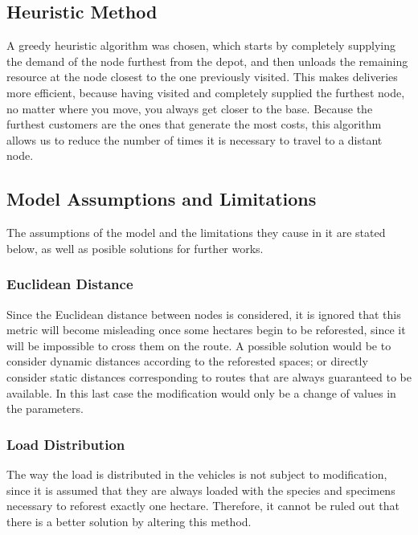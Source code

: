 \documentclass{amsart}
\begin{document}
        \subsection{Heuristic Method}\label{MetodoHeuristico}
        A greedy heuristic algorithm was chosen, which starts by completely supplying the demand of the node furthest from the depot, and then unloads the remaining resource at the node closest to the one previously visited. This makes deliveries more efficient, because having visited and completely supplied the furthest node, no matter where you move, you always get closer to the base. Because the furthest customers are the ones that generate the most costs, this algorithm allows us to reduce the number of times it is necessary to travel to a distant node.
        
        
        \subsection{Model Assumptions and Limitations}
        The assumptions of the model and the limitations they cause in it are stated below, as well as posible solutions for further works.
        
            \subsubsection{Euclidean Distance}
        
            Since the Euclidean distance between nodes is considered, it is ignored that this metric will become misleading once some hectares begin to be reforested, since it will be impossible to cross them on the route. A possible solution would be to consider dynamic distances according to the reforested spaces; or directly consider static distances corresponding to routes that are always guaranteed to be available. In this last case the modification would only be a change of values in the parameters.
            
            \subsubsection{Load Distribution}
            
            The way the load is distributed in the vehicles is not subject to modification, since it is assumed that they are always loaded with the species and specimens necessary to reforest exactly one hectare. Therefore, it cannot be ruled out that there is a better solution by altering this method.
            
\end{document}
